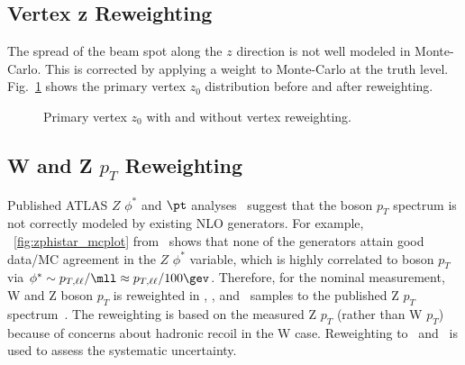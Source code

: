 \subsection{Vertex z Reweighting }
The spread of the beam spot along the $z$ direction is not well modeled in Monte-Carlo. This is corrected by applying a weight to Monte-Carlo at the truth level. Fig.~\ref{fig:mc:vxz0} shows the primary vertex $z_0$ distribution before and after reweighting.

\begin{figure}[phtb]
  \begin{center}
 \caption{ Primary vertex $z_0$ with and without vertex reweighting. }
 \label{fig:mc:vxz0}
 \end{center}
\end{figure}


\subsection{W and Z $p_T$ Reweighting }
\label{sec:bosonptreweight}
Published ATLAS $Z$ $\phi^*$ and $\pt$ analyses~\cite{Aad:2011fp} suggest that the boson $p_T$ spectrum is not correctly modeled by existing NLO generators. For example, \Fig~\ref{fig:zphistar_mcplot} from~\cite{zphistar} shows that none of the generators attain good data/MC agreement in the $Z$ $\phi^*$ variable, which is highly correlated to boson $p_T$ via $\phi^* \sim p_{T,\ell\ell}/\mll \approx p_{T,\ell\ell}/100\gev$. Therefore, for the nominal measurement, W and Z boson $p_T$ is reweighted in \Powheg\Pythia, \Powheg\Herwig, and \Mcatnlo\ samples to the published Z $p_T$ spectrum~\cite{Aad:2011gj}. The reweighting is based on the measured Z $p_T$ (rather than W $p_T$) because of concerns about hadronic recoil in the W case. Reweighting to \Sherpa\ and \Powheg\Pythiaeight\ is used to assess the systematic uncertainty.

